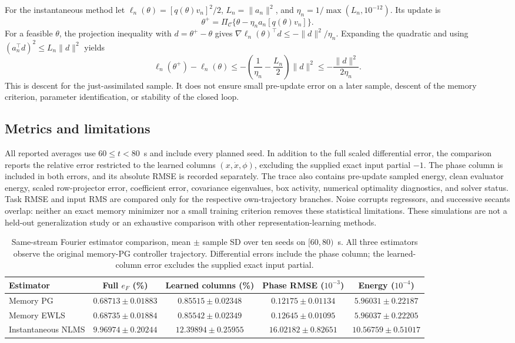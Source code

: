 \documentclass[journal]{IEEEtran}
\begin{document}
For the instantaneous method let
$\ell_n(\theta)=[q(\theta)v_n]^2/2$,
$L_n=\|a_n\|^2$, and
$\eta_n=1/\max(L_n,10^{-12})$. Its update is
\begin{equation}
 \theta^+=\Pi_{\mathcal C}\{
   \theta-\eta_n a_n[q(\theta)v_n]\}.
\end{equation}
For a feasible $\theta$, the projection inequality with
$d=\theta^+-\theta$ gives
$\nabla\ell_n(\theta)^\top d\le-\|d\|^2/\eta_n$.
Expanding the quadratic and using
$(a_n^\top d)^2\le L_n\|d\|^2$ yields
\begin{equation}
 \ell_n(\theta^+)-\ell_n(\theta)
 \le-\left(\frac1{\eta_n}-\frac{L_n}{2}\right)\|d\|^2
 \le-\frac{\|d\|^2}{2\eta_n}.
\end{equation}
This is descent for the just-assimilated sample. It does not ensure small
pre-update error on a later sample, descent of the memory criterion, parameter
identification, or stability of the closed loop.

\subsection{Metrics and limitations}
All reported averages use $60\le t<80$~s and include every planned seed.
In addition to the full scaled differential error, the comparison reports
the relative error restricted to the learned columns $(x,\dot x,\phi)$,
excluding the supplied exact input partial $-1$. The phase column is
included in both errors, and its absolute RMSE is recorded separately.
The trace also contains pre-update sampled energy, clean evaluator energy,
scaled row-projector error, coefficient error, covariance eigenvalues,
box activity, numerical optimality diagnostics, and solver status. Task RMSE
and input RMS are compared only for the respective own-trajectory branches.
Noise corrupts regressors, and successive secants overlap: neither an exact
memory minimizer nor a small training criterion removes these statistical
limitations. These simulations are not a held-out generalization study or an
exhaustive comparison with other representation-learning methods.

\begin{table}[t]
\centering
\caption{Same-stream Fourier estimator comparison, mean $\pm$ sample SD over ten seeds on $[60,80)$~s. All three estimators observe the original memory-PG controller trajectory. Differential errors include the phase column; the learned-column error excludes the supplied exact input partial.}
\begin{tabular}{lcccc}
\toprule
Estimator & Full $e_F$ (\%) & Learned columns (\%) & Phase RMSE ($10^{-3}$) & Energy ($10^{-4}$)\\
\midrule
Memory PG & $0.68713\pm0.01883$ & $0.85515\pm0.02348$ & $0.12175\pm0.01134$ & $5.96031\pm0.22187$\\
Memory EWLS & $0.68735\pm0.01884$ & $0.85542\pm0.02349$ & $0.12645\pm0.01095$ & $5.96037\pm0.22205$\\
Instantaneous NLMS & $9.96974\pm0.20244$ & $12.39894\pm0.25955$ & $16.02182\pm0.82651$ & $10.56759\pm0.51017$\\
\bottomrule
\end{tabular}
\label{tab:estimator_same_stream}
\end{table}
\end{document}
